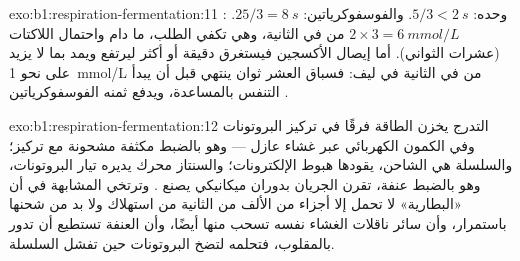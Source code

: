 \begin{solution}{exo:b1:respiration-fermentation:11}
 وحده: $5/3 < \qty{2}{s}$. والفوسفوكرياتين: $25/3 = \qty{8}{s}$.
: $2\times 3 = \qty{6}{mmol/L}$ من  في الثانية، وهي تكفي
الطلب، ما دام  واحتمال اللاكتات (عشرات الثواني). أما إيصال
الأكسجين فيستغرق دقيقة أو أكثر ليرتفع ويمد بما لا يزيد على نحو
\qty{1}{mmol/L} من  في الثانية في ليف: فسباق العشر ثوان ينتهي قبل
أن يبدأ التنفس بالمساعدة، ويدفع ثمنه الفوسفوكرياتين .
\end{solution}

\begin{solution}{exo:b1:respiration-fermentation:12}
التدرج يخزن الطاقة فرقًا في تركيز البروتونات وفي الكمون الكهربائي عبر
غشاء عازل --- وهو بالضبط مكثفة مشحونة مع  تركيز؛ والسلسلة هي
الشاحن، يقودها هبوط الإلكترونات؛ والسنتاز محرك يديره تيار البروتونات،
وهو بالضبط عنفة، تقرن الجريان بدوران ميكانيكي يصنع . وترتخي
المشابهة في أن «البطارية» لا تحمل إلا أجزاء من الألف من الثانية من
استهلاك  ولا بد من شحنها باستمرار، وأن سائر ناقلات الغشاء نفسه
تسحب منها أيضًا، وأن العنفة تستطيع أن تدور بالمقلوب، فتحلمه  لتضخ
البروتونات حين تفشل السلسلة.
\end{solution}


